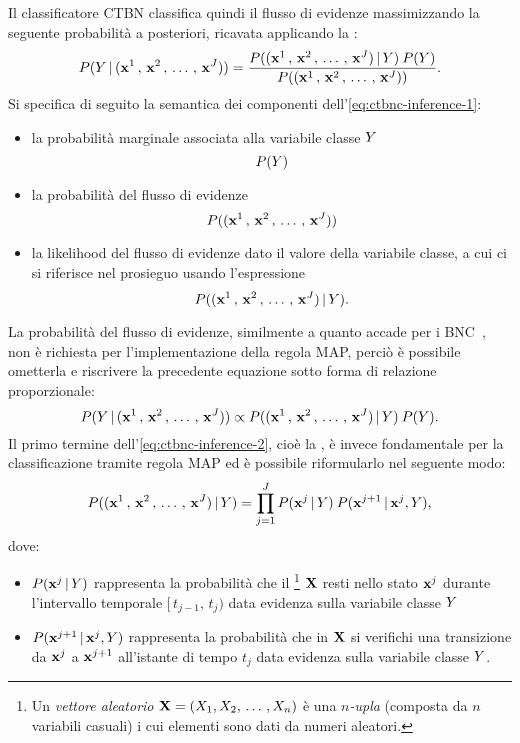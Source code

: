 Il classificatore \acs{CTBN} classifica quindi il flusso di evidenze massimizzando la seguente probabilità a posteriori, ricavata applicando la \emph{}:
\begin{equation}\label{eq:ctbnc-inference-1}
P(\mathnormal{Y}\,\arrowvert\,(\mathbf{x}^1\,,\,\mathbf{x}^2\,,\,\dotsc\,,\,\mathbf{x}^{J}))=\frac{P((\mathbf{x}^1\,,\,\mathbf{x}^2\,,\,\dotsc\,,\,\mathbf{x}^{J})\,\arrowvert\,\mathnormal{Y})\:P(\mathnormal{Y})}{P((\mathbf{x}^1\,,\,\mathbf{x}^2\,,\,\dotsc\,,\,\mathbf{x}^{J}))}\text{.}
\end{equation}
Si specifica di seguito la semantica dei componenti dell'\autoref{eq:ctbnc-inference-1}:
\begin{itemize}
\item la probabilità marginale associata alla variabile classe $\mathnormal{Y}$ \[P(\mathnormal{Y})\]
\item la probabilità del flusso di evidenze \[P((\mathbf{x}^1\,,\,\mathbf{x}^2\,,\,\dotsc\,,\,\mathbf{x}^{J}))\]
\item la likelihood del flusso di evidenze dato il valore della variabile classe, a cui ci si riferisce nel prosieguo usando l'espressione \emph{} \[P((\mathbf{x}^1\,,\,\mathbf{x}^2\,,\,\dotsc\,,\,\mathbf{x}^{J})\,\arrowvert\,\mathnormal{Y})\text{.}\]
\end{itemize}
La probabilità del flusso di evidenze, similmente a quanto accade per i \acs{BNC}~\citep{Friedman1997}, non è richiesta per l'implementazione della regola \acs{MAP}, perciò è possibile ometterla e riscrivere la precedente equazione sotto forma di relazione proporzionale:
\begin{equation}\label{eq:ctbnc-inference-2}
P(\mathnormal{Y}\,\arrowvert\,(\mathbf{x}^1\,,\,\mathbf{x}^2\,,\,\dotsc\,,\,\mathbf{x}^{J})) \propto P((\mathbf{x}^1\,,\,\mathbf{x}^2\,,\,\dotsc\,,\,\mathbf{x}^{J})\,\arrowvert\,\mathnormal{Y})\:P(\mathnormal{Y})\text{.}
\end{equation}
Il primo termine dell'\autoref{eq:ctbnc-inference-2}, cioè la \emph{}, è invece fondamentale per la classificazione tramite regola \acs{MAP} ed è possibile riformularlo nel seguente modo:
\begin{equation}\label{eq:ctbnc-inference-3}
P((\mathbf{x}^1\,,\,\mathbf{x}^2\,,\,\dotsc\,,\,\mathbf{x}^{J})\,\arrowvert\,\mathnormal{Y})=\prod_{j=1}^{J} P(\mathbf{x}^j\,\arrowvert\,\mathnormal{Y})\:P(\mathbf{x}^{j+1}\,\arrowvert\,\mathbf{x}^j,\mathnormal{Y})\text{,}
\end{equation}
dove:
\begin{itemize}
    \item $P(\mathbf{x}^j\,\arrowvert\,\mathnormal{Y})$ rappresenta la probabilità che il \emph{}\footnote{\label{note:vettore-aleatorio}Un \emph{vettore aleatorio} $\mathbf{X}=(\mathnormal{X}_1,\mathnormal{X}_2,\,\dotsc\,,\mathnormal{X}_n)$ è una $n$\emph{-upla} (composta da $n$ variabili casuali) i cui elementi sono dati da numeri aleatori.} $\mathbf{X}$ resti nello stato $\mathbf{x}^j$ durante l'intervallo temporale $[\,t_{j-1},\,t_j)$ data evidenza sulla variabile classe $\mathnormal{Y}$
    \item $P(\mathbf{x}^{j+1}\,\arrowvert\,\mathbf{x}^j,\mathnormal{Y})$ rappresenta la probabilità che in $\mathbf{X}$ si verifichi una transizione da $\mathbf{x}^j$ a $\mathbf{x}^{j+1}$ all'istante di tempo $t_j$ data evidenza sulla variabile classe $\mathnormal{Y}$.
\end{itemize}
